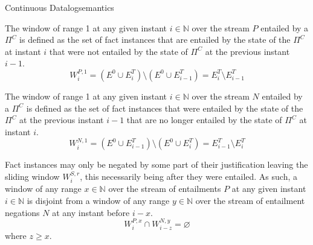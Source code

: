 \begin{nestedsection}{Continuous Datalog}{semantics}
\begin{axiom}
\label{axiom:continuous datalog: positive window increment}
The window of range 1 at any given instant ${i \in \mathbb{N}}$ over
the stream $P$ entailed by a $\Pi^C$ is defined as the set of fact instances
that are entailed by the state of the $\Pi^C$ at instant $i$ that were
not entailed by the state of $\Pi^C$ at the previous instant ${i-1}$.
\begin{equation*}
W^{P,1}_{i} = \left( E^0 \cup E^T_{i} \right) \setminus
\left( E^0 \cup E^T_{i-1} \right) = E^T_{i} \setminus E^T_{i-1}
\end{equation*}
\end{axiom}
\begin{axiom}
\label{axiom:continuous datalog: negative window increment}
The window of range 1 at any given instant ${i \in \mathbb{N}}$ over
the stream $N$ entailed by a $\Pi^C$ is defined as the set of fact instances
that were entailed by the state of the $\Pi^C$ at the previous instant
${i-1}$ that are no longer entailed by the state of $\Pi^C$ at instant $i$.
\begin{equation*}
W^{N,1}_{i} = \left( E^0 \cup E^T_{i-1} \right) \setminus
\left( E^0 \cup E^T_{i} \right) = E^T_{i-1} \setminus E^T_{i}
\end{equation*}
\end{axiom}

\begin{axiom}
\label{axiom:continuous datalog: entailment precedes negation}
Fact instances may only be negated by some part of their justification leaving
the sliding window $W^{S,r}_{i}$, this necessarily being after they
were entailed.  As such, a window of any range ${x \in \mathbb{N}}$
over the stream of entailments $P$ at any given instant ${i \in \mathbb{N}}$
is disjoint from a window of any range ${y \in \mathbb{N}}$ over the
stream of entailment negations $N$ at any instant before ${i - x}$.
\begin{equation*}
W^{P,x}_{i} \cap W^{N,y}_{i-z} = \varnothing
\end{equation*}
where $z \geq x$.
\end{axiom}


\end{nestedsection}
